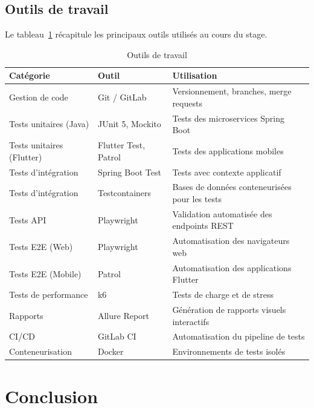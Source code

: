 \subsection{Outils de travail}
\label{subsec:outils-travail}

Le tableau~\ref{tab:outils-travail} récapitule les principaux outils utilisés au cours du stage.

\begin{table}[H]
\centering
\caption{Outils de travail}
\label{tab:outils-travail}
\begin{tabular}{|l|l|p{6cm}|}
\hline
\rowcolor{gray!20}
\textbf{Catégorie} & \textbf{Outil} & \textbf{Utilisation} \\
\hline
Gestion de code & Git / GitLab & Versionnement, branches, merge requests \\
\hline
Tests unitaires (Java) & JUnit 5, Mockito & Tests des microservices Spring Boot \\
\hline
Tests unitaires (Flutter) & Flutter Test, Patrol & Tests des applications mobiles \\
\hline
Tests d'intégration & Spring Boot Test & Tests avec contexte applicatif \\
\hline
Tests d'intégration & Testcontainers & Bases de données conteneurisées pour les tests \\
\hline
Tests API & Playwright & Validation automatisée des endpoints REST \\
\hline
Tests E2E (Web) & Playwright & Automatisation des navigateurs web \\
\hline
Tests E2E (Mobile) & Patrol & Automatisation des applications Flutter \\
\hline
Tests de performance & k6 & Tests de charge et de stress \\
\hline
Rapports & Allure Report & Génération de rapports visuels interactifs \\
\hline
CI/CD & GitLab CI & Automatisation du pipeline de tests \\
\hline
Conteneurisation & Docker & Environnements de tests isolés \\
\hline
\end{tabular}
\end{table}

\section*{Conclusion}


